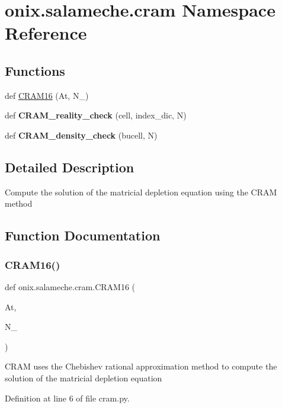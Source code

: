 \hypertarget{namespaceonix_1_1salameche_1_1cram}{}\section{onix.\+salameche.\+cram Namespace Reference}
\label{namespaceonix_1_1salameche_1_1cram}
\subsection*{Functions}
\begin{DoxyCompactItemize}
\item 
def \hyperlink{namespaceonix_1_1salameche_1_1cram_a2fdffaa6b07b62ff4b9950643f513584}{C\+R\+A\+M16} (At, N\+\_)
\item 
\mbox{\label{namespaceonix_1_1salameche_1_1cram_a12b7c54476d44b0dbf9d9285385f1359}} 
def {\bfseries C\+R\+A\+M\+\_\+reality\+\_\+check} (cell, index\+\_\+dic, N)
\item 
\mbox{\label{namespaceonix_1_1salameche_1_1cram_a86f5bbdb6ff5aba5dc5f7c063ba482cb}} 
def {\bfseries C\+R\+A\+M\+\_\+density\+\_\+check} (bucell, N)
\end{DoxyCompactItemize}


\subsection{Detailed Description}
\begin{DoxyVerb}Compute the solution of the matricial depletion equation using the CRAM method\end{DoxyVerb}
 

\subsection{Function Documentation}
\mbox{\label{namespaceonix_1_1salameche_1_1cram_a2fdffaa6b07b62ff4b9950643f513584}} 
\subsubsection{\texorpdfstring{C\+R\+A\+M16()}{CRAM16()}}
{\footnotesize\ttfamily def onix.\+salameche.\+cram.\+C\+R\+A\+M16 (\begin{DoxyParamCaption}\item[{}]{At,  }\item[{}]{N\+\_ }\end{DoxyParamCaption})}

\begin{DoxyVerb}CRAM uses the Chebishev rational approximation method to compute the solution of the matricial depletion equation\end{DoxyVerb}
 

Definition at line 6 of file cram.\+py.

